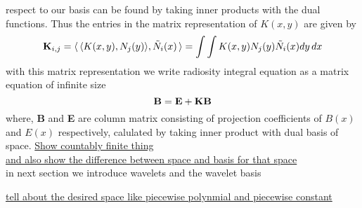 respect to our basis can be found by taking inner products with the dual functions. Thus the entries in the matrix representation
of $K(x,y)$ are given by\\
\begin{equation}\label{eq:kijcalc}
{\bf K}_{i,j}=\langle\, \langle K(x,y),N_j(y)\rangle,\tilde{N}_i(x) \,\rangle =\int \int K(x,y)N_j(y)\tilde{N}_i(x) dy\,dx
\end{equation}
with this matrix representation we write radiosity integral equation as a  matrix equation of infinite size\\
\begin{equation}
\bf{B=E+KB}
\end{equation}
where, {\bf B} and {\bf E} are column matrix consisting of projection coefficients of $B(x)$ and $E(x)$ respectively, calulated by taking inner product with dual basis of space. 
\underline{ Show countably finite thing \\ and also show the difference between space and basis for that space}\\

in next section we introduce wavelets and the wavelet basis


\underline{tell about the desired space like piecewise polynmial and piecewise constant}
\\\\